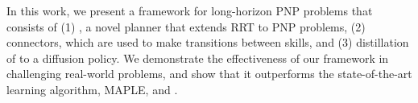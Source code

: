 In this work, we present a framework for long-horizon PNP problems that consists of (1) \skillrrt, a novel planner that extends RRT to PNP problems, (2) connectors, which are used to make transitions between skills, and (3) distillation of \skillrrt{} to a diffusion policy. We demonstrate the effectiveness of our framework in challenging real-world problems, and show that it outperforms the state-of-the-art learning algorithm, MAPLE, and \skillrrt.



